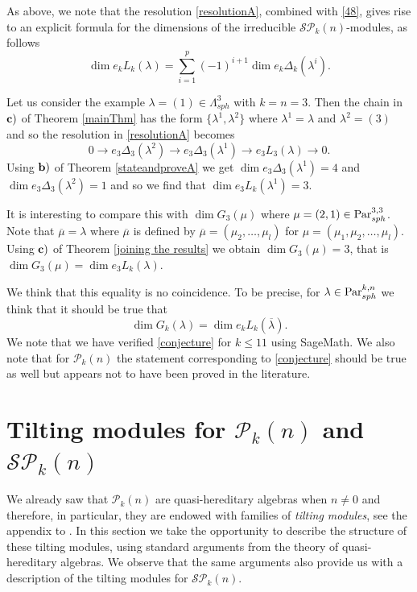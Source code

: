 \documentclass[10pt,hidelinks]{article}
\newcommand{\ParAlg}{{\mathcal P }_{k}}
\newcommand{\SpheAlg}{{\mathcal{SP} }_{k}}
\newcommand{\Par}{{\rm Par}   }
\newcommand{\ParSph}{  \Par_{sph}^{k, n}}
\numberwithin{equation}{section}
\begin{document}
As above, we note that the resolution \eqref{resolutionA}, combined with \eqref{48}, gives rise to an explicit formula for
the dimensions of the irreducible $ \SpheAlg(n)$-modules, as follows
\begin{equation}
\dim e_k L_k(\lambda) = \sum_{i=1}^p (-1)^{i+1} \dim e_k \Delta_k(\lambda^i). 
\end{equation}  


Let us consider the example $ \lambda = (1) \in \Lambda^3_{sph}$ with $ k=n=3$. 
Then the chain in ${ \bf c)} $ of Theorem \ref{mainThm} has the form $ \{ \lambda^1, \lambda^2 \} $ where
$ \lambda^1 = \lambda $ and $ \lambda^2 = (3) $ and so the resolution in 
\eqref{resolutionA} becomes 
\begin{equation}
0 \rightarrow e_3\Delta_3(\lambda^2 ) \rightarrow e_3\Delta_3(\lambda^1 ) \rightarrow e_3L_3(\lambda  )
\rightarrow 0.
\end{equation}
Using ${ \bf b)} $ of Theorem \ref{stateandproveA} we get $ \dim e_3\Delta_3(\lambda^1 )= 4$ and
$ \dim e_3\Delta_3(\lambda^2 )= 1$ and so we find that $ \dim e_3L_k(\lambda^1 )= 3$. 

\medskip
It is interesting to compare this with $ \dim G_3(\mu) $ where $ \mu =(2,1) \in  \Par_{sph}^{3, 3}$.
Note that $ \overline{\mu} = \lambda $ where $ \overline{\mu} $ 
is defined by $ \overline{ \mu } = ( \mu_2, \ldots, \mu_l)  $ for
$ \mu = (\mu_1, \mu_2, \ldots, \mu_l)$. 
Using
${ \bf c)} $ of Theorem \ref{joining the results} we obtain $ \dim G_3(\mu)  = 3$, that is 
$   \dim G_3(\mu) =  \dim e_3L_k(\lambda ) $.

\medskip 
We think that this equality is no coincidence. To be precise, for $ \lambda \in \ParSph$
we think that it should be true that
\begin{equation}\label{conjecture}
\dim G_k(\lambda ) = \dim e_kL_k(\overline{\lambda} ).
\end{equation}
We note that we have verified \eqref{conjecture} for $ k \le 11 $ using SageMath. We also note that
for $ \ParAlg(n) $ the statement corresponding to \eqref{conjecture} should be true as well but appears not to have been proved
in the literature.


\section{Tilting modules for $ \ParAlg(n) $ and $ \SpheAlg(n)$}\label{tilting}
We already saw that $  \ParAlg(n) $ are quasi-hereditary algebras when 
$ n \neq 0$ and therefore, in particular, they 
are endowed with families of {\it tilting modules}, see the appendix to \cite{Donkin}. 
In this section we take the opportunity to 
describe the structure of these tilting modules, using standard 
arguments from the theory of
quasi-hereditary algebras.
We observe that the same arguments also provide us 
with a description of the tilting modules for $ \SpheAlg(n)$. 
\end{document}
